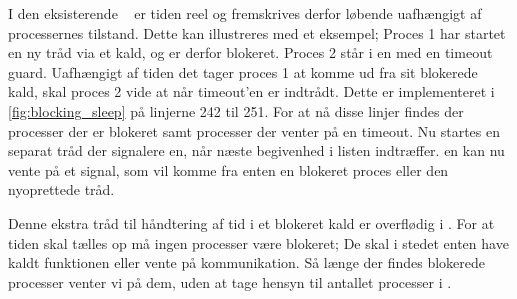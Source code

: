 I den eksisterende \sched ~ er tiden reel og fremskrives derfor løbende uafhængigt af processernes tilstand. Dette kan illustreres med et eksempel; Proces 1 har startet en ny tråd via et  kald, og er derfor blokeret. Proces 2 står i en  med en timeout guard. Uafhængigt af tiden det tager proces 1 at komme ud fra sit blokerede kald, skal proces 2 vide at når timeout'en er indtrådt. Dette er implementeret i \cref{fig:blocking_sleep} på linjerne 242 til 251. For at nå disse linjer findes der processer der er blokeret samt processer der venter på en timeout. Nu startes en separat tråd der signalere \sched en, når næste begivenhed i  listen indtræffer. \Sched en kan nu vente på et signal, som vil komme fra enten en blokeret proces eller den nyoprettede tråd.

Denne ekstra tråd til håndtering af tid i et blokeret kald er overflødig i \des. For at tiden skal tælles op må ingen processer være blokeret; De skal i stedet enten have kaldt funktionen  eller vente på kommunikation.  
Så længe der findes blokerede processer venter vi på dem, uden at tage hensyn til antallet processer i .

